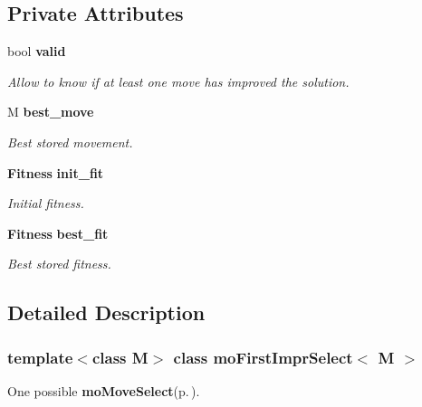 \subsection*{Private Attributes}
\begin{CompactItemize}
\item 
bool {\bf valid}\label{classmo_first_impr_select_a99c0586ba07449234705c17a258d58c}

\begin{CompactList}\small\item\em Allow to know if at least one move has improved the solution. \item\end{CompactList}\item 
M {\bf best\_\-move}\label{classmo_first_impr_select_dfed419a608dd7c41f07fa1f1279cb8c}

\begin{CompactList}\small\item\em Best stored movement. \item\end{CompactList}\item 
{\bf Fitness} {\bf init\_\-fit}\label{classmo_first_impr_select_ce7ba63e8cc3a9164f4e546477e98ca8}

\begin{CompactList}\small\item\em Initial fitness. \item\end{CompactList}\item 
{\bf Fitness} {\bf best\_\-fit}\label{classmo_first_impr_select_e1190347b76ec6fe717be32354b4a9a9}

\begin{CompactList}\small\item\em Best stored fitness. \item\end{CompactList}\end{CompactItemize}


\subsection{Detailed Description}
\subsubsection*{template$<$class M$>$ class mo\-First\-Impr\-Select$<$ M $>$}

One possible {\bf mo\-Move\-Select}{\rm (p.\,\pageref{classmo_move_select})}. 


